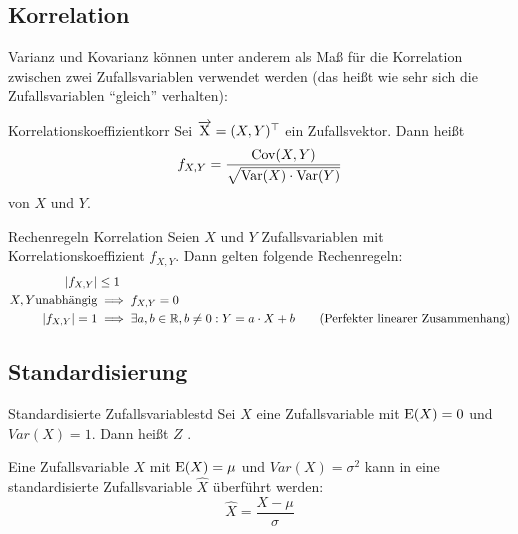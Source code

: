 \subsection{Korrelation}

Varianz und Kovarianz können unter anderem als Maß für die Korrelation zwischen
zwei Zufallsvariablen verwendet werden (das heißt wie sehr sich die
Zufallsvariablen "`gleich"' verhalten):
\begin{definition}{Korrelationskoeffizient}{korr}
Sei $\overrightarrow{\mathrm{X}}=(X,Y)^\top$ ein Zufallsvektor. Dann heißt
\[
f_{X,Y} = \frac{\operatorname{Cov}(X,Y)}{\sqrt{\operatorname{Var}(X)\cdot\operatorname{Var}(Y)}}
\]
 von $X$ und $Y$.
\end{definition}

\begin{theorem}{Rechenregeln Korrelation}
Seien $X$ und $Y$ Zufallsvariablen mit Korrelationskoeffizient $f_{X,Y}$.
Dann gelten folgende Rechenregeln:
\begin{align*}
|f_{X,Y}| &\le 1 \\
X,Y \text{unabhängig} &\implies f_{X,Y} = 0 \\
|f_{X,Y}| = 1 &\implies \exists a,b\in\mathbb{R}, b\ne0: Y=a\cdot X + b \tag{Perfekter
linearer Zusammenhang}
\end{align*}
\end{theorem}

\subsection{Standardisierung}

\begin{definition}{Standardisierte Zufallsvariable}{std}
Sei $X$ eine Zufallsvariable mit $\operatorname{E}(X) = 0$ und $Var(X) = 1$. Dann heißt $Z$
.
\end{definition}

Eine Zufallsvariable $X$ mit $\operatorname{E}(X) = \mu$ und $Var(X)=\sigma^2$ kann in eine
standardisierte Zufallsvariable $\hat{X}$ überführt werden:
\[
\hat{X} = \frac{X-\mu}{\sigma}
\]
